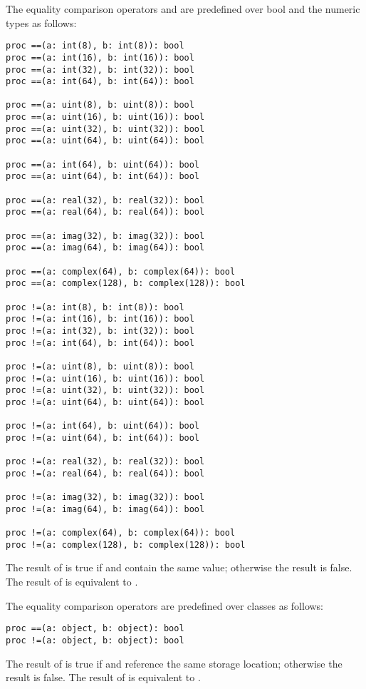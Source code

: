 The equality comparison operators \chpl{==} and \chpl{\!=} are predefined over bool and the
numeric types as follows:
\begin{chapel}
\begin{verbatim}
proc ==(a: int(8), b: int(8)): bool
proc ==(a: int(16), b: int(16)): bool
proc ==(a: int(32), b: int(32)): bool
proc ==(a: int(64), b: int(64)): bool

proc ==(a: uint(8), b: uint(8)): bool
proc ==(a: uint(16), b: uint(16)): bool
proc ==(a: uint(32), b: uint(32)): bool
proc ==(a: uint(64), b: uint(64)): bool

proc ==(a: int(64), b: uint(64)): bool
proc ==(a: uint(64), b: int(64)): bool

proc ==(a: real(32), b: real(32)): bool
proc ==(a: real(64), b: real(64)): bool

proc ==(a: imag(32), b: imag(32)): bool
proc ==(a: imag(64), b: imag(64)): bool

proc ==(a: complex(64), b: complex(64)): bool
proc ==(a: complex(128), b: complex(128)): bool

proc !=(a: int(8), b: int(8)): bool
proc !=(a: int(16), b: int(16)): bool
proc !=(a: int(32), b: int(32)): bool
proc !=(a: int(64), b: int(64)): bool

proc !=(a: uint(8), b: uint(8)): bool
proc !=(a: uint(16), b: uint(16)): bool
proc !=(a: uint(32), b: uint(32)): bool
proc !=(a: uint(64), b: uint(64)): bool

proc !=(a: int(64), b: uint(64)): bool
proc !=(a: uint(64), b: int(64)): bool

proc !=(a: real(32), b: real(32)): bool
proc !=(a: real(64), b: real(64)): bool

proc !=(a: imag(32), b: imag(32)): bool
proc !=(a: imag(64), b: imag(64)): bool

proc !=(a: complex(64), b: complex(64)): bool
proc !=(a: complex(128), b: complex(128)): bool
\end{verbatim}
\end{chapel}
The result of  is true if  and  contain
the same value; otherwise the result is false.  The result of
 is equivalent to .

The equality comparison operators are predefined over classes as
follows:
\begin{chapel}
\begin{verbatim}
proc ==(a: object, b: object): bool
proc !=(a: object, b: object): bool
\end{verbatim}
\end{chapel}
The result of  is true if  and  reference
the same storage location; otherwise the result is false.  The result
of  is equivalent to .

